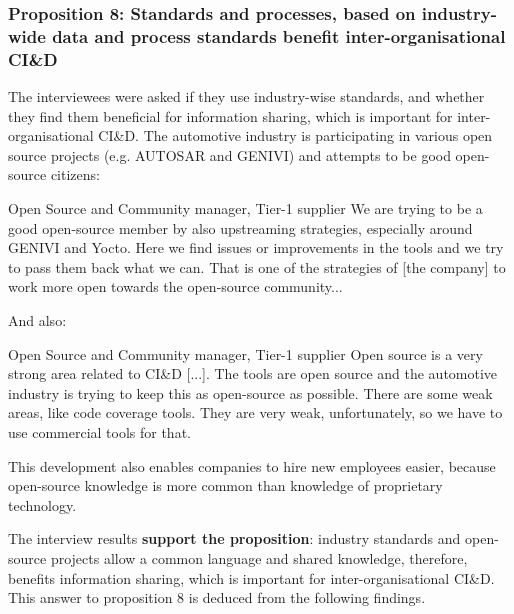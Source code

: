 \vspace{.2cm}
\subsubsection{Proposition 8: Standards and processes, based on industry-wide data and process standards benefit inter-organisational CI\&D}

The interviewees were asked if they use industry-wise standards, and whether they find them beneficial for information sharing, which is important for inter-organisational CI\&D. The automotive industry is participating in various open source projects (e.g. AUTOSAR and GENIVI) and attempts to be good open-source citizens:

\begin{aquote}{Open Source and Community manager, Tier-1 supplier}
We are trying to be a good open-source member by also upstreaming strategies, especially around GENIVI and Yocto. Here we find issues or improvements in the tools and we try to pass them back what we can. That is one of the strategies of [the company] to work more open towards the open-source community...%
\end{aquote}

And also:

\begin{aquote}{Open Source and Community manager, Tier-1 supplier}
Open source is a very strong area related to CI\&D [...]. The tools are open source and the automotive industry is trying to keep this as open-source as possible. There are some weak areas, like code coverage tools. They are very weak, unfortunately, so we have to use commercial tools for that.
\end{aquote}

This development also enables companies to hire new employees easier, because open-source knowledge is more common than knowledge of proprietary technology.


The interview results {\bf support the proposition}: industry standards and open-source projects allow a common language and shared knowledge, therefore, benefits information sharing, which is important for inter-organisational CI\&D. This answer to proposition 8 is deduced from the following findings.

